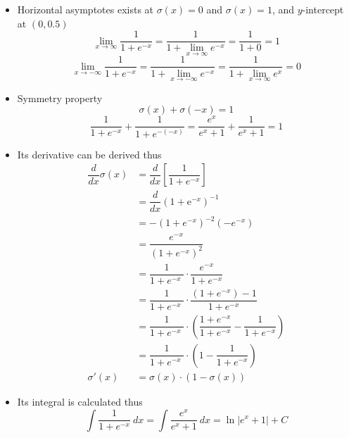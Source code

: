 \documentclass[12pt]{report}
\numberwithin{equation}{section}
\begin{document}
\begin{itemize}
\item Horizontal asymptotes exists at $\sigma(x)=0$ and $\sigma(x)=1$, and $y$-intercept at $(0,0.5)$
	\[
	\lim_{x \rightarrow \infty} \frac{1}{1+e^{-x}}=\frac{1}{1+\lim_{x \rightarrow 			\infty} e^{-x}}=\frac{1}{1+0}=1 \]
	\[ \lim_{x \rightarrow-\infty} \frac{1}{1+e^{-x}}=\frac{1}{1+\lim _{x \rightarrow-		\infty} e^{-x}}=\frac{1}{1+\lim_{x \rightarrow \infty} e^{x}}=0 \]
\item Symmetry property
	\begin{equation}\label{eqn:sigma1}
	\sigma(x) + \sigma(-x) = 1
	\end{equation}
	\[
	\frac{1}{1+e^{-x}}+\frac{1}{1+e^{-(-x)}}=\frac{e^{x}}{e^{x}+1}+\frac{1}{e^{x}+1}=1
	\]

\item Its derivative can be derived thus 
	\begin{equation}\label{eqn:sigma2}
	\begin{split}
	\dfrac{d}{dx} \sigma(x) &= \dfrac{d}{dx} \left[ \dfrac{1}{1 + e^{-x}} \right] \\
	&= \dfrac{d}{dx} \left( 1 + \mathrm{e}^{-x} \right)^{-1} \\
	&= -(1 + e^{-x})^{-2}(-e^{-x}) \\
	&= \dfrac{e^{-x}}{\left(1 + e^{-x}\right)^2} \\
	&= \dfrac{1}{1 + e^{-x}\ } \cdot \dfrac{e^{-x}}{1 + e^{-x}}  \\
	&= \dfrac{1}{1 + e^{-x}\ } \cdot \dfrac{(1 + e^{-x}) - 1}{1 + e^{-x}}  \\
	&= \dfrac{1}{1 + e^{-x}\ } \cdot \left( \dfrac{1 + e^{-x}}{1 + e^{-x}} - \dfrac{1}		{1 + e^{-x}} \right) \\
	&= \dfrac{1}{1 + e^{-x}\ } \cdot \left( 1 - \dfrac{1}{1 + e^{-x}} \right) \\
	\sigma'(x) &= \sigma(x) \cdot (1 - \sigma(x))
	\end{split}
	\end{equation}
\item Its integral is calculated thus 
	\begin{equation}\label{eqn:sigma3}
	\int \frac{1}{1+e^{-x}}\ dx  = \int \frac{e^{x}}{e^{x}+1}\ dx =\ln \left|e^{x}			+1\right|+C
	\end{equation}		
\end{itemize}


\end{document}

